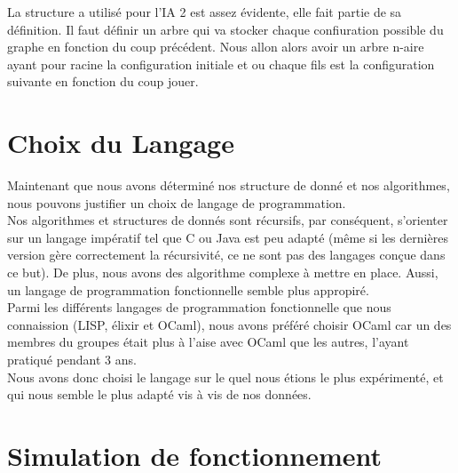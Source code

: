 \documentclass[a4paper,12pt]{report}
\begin{document}
La structure a utilis\'e pour l'IA 2 est assez \'evidente, elle fait partie de sa d\'efinition. Il faut d\'efinir un arbre qui va stocker chaque confiuration possible du graphe en fonction du coup pr\'ec\'edent. Nous allon alors avoir un arbre n-aire ayant pour racine la configuration initiale et ou chaque fils est la configuration suivante en fonction du coup jouer. 


\part{Choix du Langage}

Maintenant que nous avons d\'etermin\'e nos structure de donn\'e et nos algorithmes, nous pouvons justifier un choix de langage de programmation. \\
Nos algorithmes et structures de donn\'es sont r\'ecursifs, par cons\'equent, s'orienter sur un langage imp\'eratif tel que C ou Java est peu adapt\'e (m\^eme si les derni\`eres version g\`ere correctement la r\'ecursivit\'e, ce ne sont pas des langages con\c{c}ue dans ce but). De plus, nous avons des algorithme complexe \`a mettre en place. Aussi, un langage de programmation fonctionnelle semble plus appropir\'e. \\
Parmi les diff\'erents langages de programmation fonctionnelle que nous connaission (LISP, \'elixir et OCaml), nous avons pr\'ef\'er\'e choisir OCaml car un des membres du groupes \'etait plus \`a l'aise avec OCaml que les autres, l'ayant pratiqu\'e pendant 3 ans. \\
Nous avons donc choisi le langage sur le quel nous \'etions le plus exp\'eriment\'e, et qui nous semble le plus adapt\'e vis \`a vis de nos donn\'ees.

\part{Simulation de fonctionnement}
\end{document}
